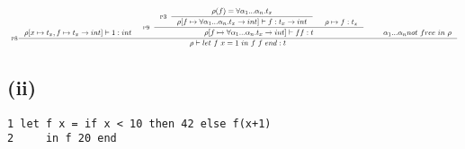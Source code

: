 \documentclass[a4paper]{article}
\newcommand{\RULE}[1]{\textsc{#1}}
\begin{document}
\begin{displaymath}
  \scalebox{0.6}{
    \inference[\RULE{p8}]{
      \rho[x \mapsto t_x, f \mapsto t_x \to int] \vdash 1 : int &
      \inference[\RULE{p9}]{
        \inference[\RULE{p3}]{
          \rho (f) = \forall \alpha_1 ... \alpha_n.t_x
        }{
          \rho [f \mapsto \forall \alpha_1 ... \alpha_n.t_x \to int] \vdash f : t_x \to int
        } &
        \rho \mapsto f : t_x
      }{
        \rho[f \mapsto \forall \alpha_1 ... \alpha_n.t_x \to int] \vdash ff : t 
      } &
      \quad \alpha_1 ... \alpha_n not\ free\ in\ \rho
    }{
      \rho \vdash let\ f\ x = 1\ in\ f\ f\ end : t
    }
  }
\end{displaymath}

\subsection*{(ii)}
\begin{verbatim}
1 let f x = if x < 10 then 42 else f(x+1)
2     in f 20 end
\end{verbatim}
\end{document}
